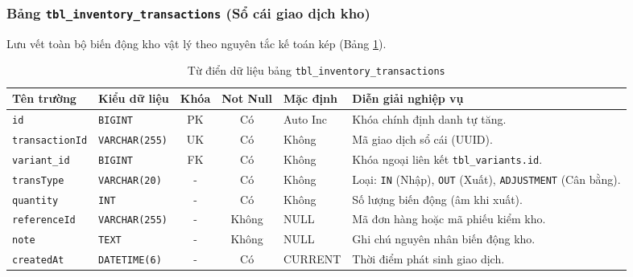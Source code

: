 \subsubsection{Bảng \texttt{tbl\_inventory\_transactions} (Sổ cái giao dịch kho)}
Lưu vết toàn bộ biến động kho vật lý theo nguyên tắc kế toán kép (Bảng \ref{tab:tbl_inventory}).

\begin{table}[htbp]
\centering
\caption{Từ điển dữ liệu bảng \texttt{tbl\_inventory\_transactions}}
\label{tab:tbl_inventory}
\vspace{2mm}
\begin{tabularx}{\textwidth}{|p{2.5cm}|p{2.8cm}|c|c|p{1.8cm}|X|}
\hline
\textbf{Tên trường} & \textbf{Kiểu dữ liệu} & \textbf{Khóa} & \textbf{Not Null} & \textbf{Mặc định} & \textbf{Diễn giải nghiệp vụ} \\ \hline
\texttt{id} & \texttt{BIGINT} & PK & Có & Auto Inc & Khóa chính định danh tự tăng. \\ \hline
\texttt{transactionId} & \texttt{VARCHAR(255)} & UK & Có & Không & Mã giao dịch sổ cái (UUID). \\ \hline
\texttt{variant\_id} & \texttt{BIGINT} & FK & Có & Không & Khóa ngoại liên kết \texttt{tbl\_variants.id}. \\ \hline
\texttt{transType} & \texttt{VARCHAR(20)} & - & Có & Không & Loại: \texttt{IN} (Nhập), \texttt{OUT} (Xuất), \texttt{ADJUSTMENT} (Cân bằng). \\ \hline
\texttt{quantity} & \texttt{INT} & - & Có & Không & Số lượng biến động (âm khi xuất). \\ \hline
\texttt{referenceId} & \texttt{VARCHAR(255)} & - & Không & NULL & Mã đơn hàng hoặc mã phiếu kiểm kho. \\ \hline
\texttt{note} & \texttt{TEXT} & - & Không & NULL & Ghi chú nguyên nhân biến động kho. \\ \hline
\texttt{createdAt} & \texttt{DATETIME(6)} & - & Có & CURRENT & Thời điểm phát sinh giao dịch. \\ \hline
\end{tabularx}
\end{table}

